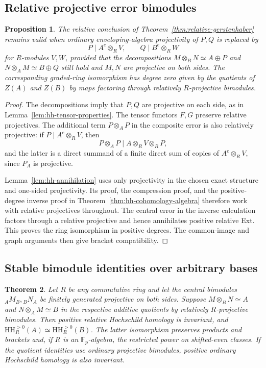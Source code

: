 \documentclass[12pt,a4paper,english,reqno]{amsart}
\numberwithin{equation}{section}
\theoremstyle{plain}
\newtheorem{theorem}{Theorem}[section]
\newtheorem{proposition}[theorem]{Proposition}
\theoremstyle{definition}
\begin{document}
\subsection{Relative projective error bimodules}

\begin{proposition}
\label{prop:gerstenhaber-relative-errors}
The relative conclusion of Theorem~\ref{thm:relative-gerstenhaber}
remains valid when ordinary enveloping-algebra projectivity of $P,Q$
is replaced by
\[
 P\mid A^e\otimes_R V,\qquad
 Q\mid B^e\otimes_R W
\]
for $R$-modules $V,W$, provided that the decompositions
$M\otimes_BN\simeq A\oplus P$ and
$N\otimes_AM\simeq B\oplus Q$ still hold and $M,N$ are
projective on both sides.  The corresponding graded-ring
isomorphism has degree zero given by the quotients of $Z(A)$ and
$Z(B)$ by maps factoring through relatively $R$-projective
bimodules.
\end{proposition}

\begin{proof}
The decompositions imply that $P,Q$ are projective on each side,
as in Lemma~\ref{lem:hh-tensor-properties}.  The tensor functors
$F,G$ preserve relative projectives.  The additional term $P\otimes_AP$ in the composite error is
also relatively projective: if $P\mid A^e\otimes_R V$, then
\[
 P\otimes_AP\mid A\otimes_R V\otimes_R P,
\]
and the latter is a direct summand of a finite direct sum of copies
of $A^e\otimes_R V$, since $P_A$ is projective.

Lemma~\ref{lem:hh-annihilation} uses only projectivity in the
chosen exact structure and one-sided projectivity.  Its proof,
the compression proof, and the positive-degree inverse proof in
Theorem~\ref{thm:hh-cohomology-algebra} therefore work with
relative projectives throughout.  The central error in the inverse
calculation factors through a relative projective and hence
annihilates positive relative Ext.  This proves the ring isomorphism
in positive degrees.  The common-image and graph arguments then
give bracket compatibility.
\end{proof}

\subsection{Stable bimodule identities over arbitrary bases}

\begin{theorem}\label{cor:gerstenhaber-stable-identities}
Let $R$ be any commutative ring and let the central bimodules
$ {}_AM_B,{}_BN_A$ be finitely generated projective on both sides.
Suppose $M\otimes_BN\simeq A$ and $N\otimes_AM\simeq B$ in the
respective additive quotients by relatively $R$-projective
bimodules. Then positive relative Hochschild homology is invariant,
and $\mathrm{HH}^{>0}_R(A)\simeq\mathrm{HH}^{>0}_R(B)$.
The latter isomorphism preserves products and brackets and, if $R$
is an $\mathbb F_p$-algebra, the restricted power on shifted-even
classes. If the quotient identities use ordinary projective
bimodules, positive ordinary Hochschild homology is also invariant.
\end{theorem}
\end{document}
